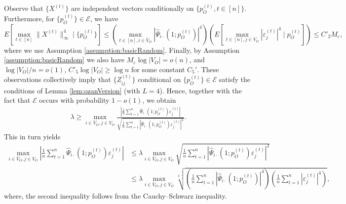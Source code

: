 \documentclass[opre,nonblindrev]{informs3} %
\begin{document}
\begin{APPENDIX}{}
Observe that   $\{X^{(t)}\}$ are independent vectors conditionally on $\{p_O^{(t)} , t\in[n]\}$.
Furthermore,
for $\{p_O^{(t)}\} \in \mathcal{E}$, 
we have
$$E\left[\max_{t \in [n]} \|X^{(t)}\|_\infty^4 \mid \{p_O^{(t)} \} \right]
\leq 
\left(\max_{t \in [n],{i \in \bar{V}_O}}
|\hat \Psi_{i\cdot} (1;p_O^{(t)} )|^4
\right)\left(  
E\left[\max_{t \in [n], j\in V_O} |\varepsilon_j^{(t)}|^4 \mid p_O^{(t)}\right]
\right)
\leq C'_2 M_\varepsilon,
$$
where we use
 Assumption 
\ref{assumption:basicRandom}.
Finally,
by Assumption \ref{assumption:basicRandom} we also have
$M_\varepsilon \log |V_O| = o(n)$,
and $\log |V_O|/n = o(1)$,  $C'_5 \log |V_O| \geq \log n$  for some constant $C_5'$.
These observations collectively imply that  $\{Z_{ij}^{(t)} \}$ conditional on $\{p_O^{(t)} \}\in {\mathcal E}$ satisfy the conditions of Lemma \ref{lem:ozanVersion} (with $L=4$). 
Hence, together with the fact that $\mathcal{E}$ occurs with  probability $1-o(1)$, we obtain
\begin{equation} \label{eq:Thm2DetailStepPre}
\begin{aligned}
\lambda \geq 
\max_{i\in \bar{V}_O, j\in V_O}
\frac{   \left|   \frac{1}{n} \sum_{t=1}^n \hat\Psi_{i\cdot}(1;p_O^{(t)} ) \varepsilon_j^{(t)}\right| }{
	\sqrt{
		\frac{1}{n} \sum_{t=1}^n
		\left|   
		\hat\Psi_{i\cdot}(1;p_O^{(t)} ) \varepsilon_j^{(t)}\right|^2
	}
} .
\end{aligned}
\end{equation}
This in turn yields
\begin{equation} \label{eq:Thm2DetailStep}
\begin{aligned}
\max_{i\in \bar{V}_O, j\in V_O} \left|   \frac{1}{n} \sum_{t=1}^n \hat\Psi_{i\cdot}(1;p_O^{(t)} ) \varepsilon_j^{(t)}\right|
&\leq \lambda 
\max_{i\in \bar{V}_O, j\in V_O}
\sqrt{
	\frac{1}{n} \sum_{t=1}^n
	\left|   
	\hat\Psi_{i\cdot}(1;p_O^{(t)} ) \varepsilon_j^{(t)}\right|^2
}\\
&\leq 
{\lambda }
\max_{i\in \bar{V}_O, j\in V_O}
\sqrt[4]{\left(\frac{1}{n}\sum_{t=1}^n
	\left|   
	\hat\Psi_{i\cdot}(1;p_O^{(t)} ) \right|^4\right)
	\left(\frac{1}{n}\sum_{t=1}^n
	\left|   
	\varepsilon_j^{(t)} \right|^4\right)
},
\end{aligned}
\end{equation}
where, the second inequality follows from the Cauchy--Schwarz inequality.




\end{APPENDIX}
\end{document}
